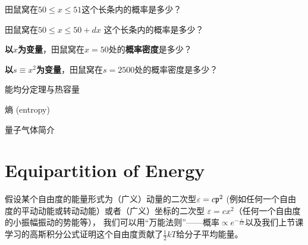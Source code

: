 \documentclass[CJK]{beamer}
\begin{document}
\begin{frame}
\bch


田鼠窝在$50\le x\le 51$这个长条内的概率是多少？

\ech
\end{frame}


\begin{frame}
\bch


田鼠窝在$50\le x\le 50 + dx$ 这个长条内的概率是多少？

\ech
\end{frame}


\begin{frame}
\bch


{\bf 以$x$为变量}，田鼠窝在$x=50$处的{\bf 概率密度}是多少？

\ech
\end{frame}


\begin{frame}
\bch


{\bf 以$s\equiv x^2$为变量}，田鼠窝在$s=2500$处的概率密度是多少？

\ech
\end{frame}


\begin{frame}
\bch
\bitem
\item{能均分定理与热容量}
\item{熵 (entropy)}
\item{量子气体简介}
\eitem
\ech
\end{frame}




\section{Equipartition of Energy}


\begin{frame}
\bch

假设某个自由度的能量形式为（广义）动量的二次型$\varepsilon = c{\mathfrak{p}}^2$ (例如任何一个自由度的平动动能或转动动能）或者（广义）坐标的二次型 $\varepsilon = cx^2$（任何一个自由度的小振幅振动的势能等）， 我们可以用“万能法则”——概率$\propto e^{-\frac{\varepsilon}{kT}}$以及我们上节课学习的高斯积分公式证明这个自由度贡献了$\frac{1}{2}kT$给分子平均能量。

\ech
\end{frame}
\end{document}
